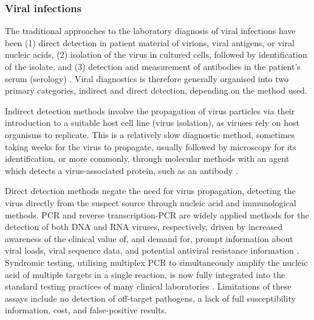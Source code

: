 \subsubsection{Viral infections} \label{sssec:viral}

The traditional approaches to the laboratory diagnosis of viral infections have been (1) direct detection in patient material of virions, viral antigens, or viral nucleic acids, (2) isolation of the virus in cultured cells, followed by identification of the isolate, and (3) detection and measurement of antibodies in the patient’s serum (serology) \citep{burrell_laboratory_2017}. Viral diagnostics is therefore generally organised into two primary categories, indirect and direct detection, depending on the method used. 

Indirect detection methods involve the propagation of virus particles via their introduction to a suitable host cell line (virus isolation), as viruses rely on host organisms to replicate. This is a relatively slow diagnostic method, sometimes taking weeks for the virus to propagate, usually followed by microscopy for its identification, or more commonly, through molecular methods with an agent which detects a virus-associated protein, such as an antibody \citep{cassedy_virus_2021}. 

Direct detection methods negate the need for virus propagation, detecting the virus directly from the suspect source through nucleic acid and immunological methods. PCR and reverse transcription-PCR are widely applied methods for the detection of both DNA and RNA viruses, respectively, driven by increased awareness of the clinical value of, and demand for, prompt information about viral loads, viral sequence data, and potential antiviral resistance information \citep{cassedy_virus_2021}. Syndromic testing, utilising multiplex PCR to simultaneously amplify the nucleic acid of multiple targets in a single reaction, is now fully integrated into the standard testing practices of many clinical laboratories \citep{dien_bard_panels_2020}. Limitations of these assays include no detection of off-target pathogens, a lack of full susceptibility information, cost, and false-positive results.

